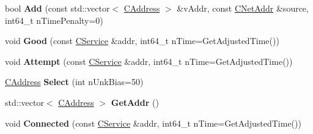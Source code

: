 \begin{DoxyCompactItemize}
\item 
\mbox{\label{class_c_addr_man_aa2ae2abdf710b2d81fa37f072bab028e}} 
bool {\bfseries Add} (const std\+::vector$<$ \mbox{\hyperlink{class_c_address}{C\+Address}} $>$ \&v\+Addr, const \mbox{\hyperlink{class_c_net_addr}{C\+Net\+Addr}} \&source, int64\+\_\+t n\+Time\+Penalty=0)
\item 
\mbox{\label{class_c_addr_man_a993e80e74701d7bc6bb49880c387b847}} 
void {\bfseries Good} (const \mbox{\hyperlink{class_c_service}{C\+Service}} \&addr, int64\+\_\+t n\+Time=Get\+Adjusted\+Time())
\item 
\mbox{\label{class_c_addr_man_afcddc2573121065177dc981cea710789}} 
void {\bfseries Attempt} (const \mbox{\hyperlink{class_c_service}{C\+Service}} \&addr, int64\+\_\+t n\+Time=Get\+Adjusted\+Time())
\item 
\mbox{\label{class_c_addr_man_a6aa6708d0ee55dba9ec6cefc9811c8e3}} 
\mbox{\hyperlink{class_c_address}{C\+Address}} {\bfseries Select} (int n\+Unk\+Bias=50)
\item 
\mbox{\label{class_c_addr_man_a69cc6138e696cf88de60925d26023bf2}} 
std\+::vector$<$ \mbox{\hyperlink{class_c_address}{C\+Address}} $>$ {\bfseries Get\+Addr} ()
\item 
\mbox{\label{class_c_addr_man_a7aba66d9e9527522fed974567d34c322}} 
void {\bfseries Connected} (const \mbox{\hyperlink{class_c_service}{C\+Service}} \&addr, int64\+\_\+t n\+Time=Get\+Adjusted\+Time())
\end{DoxyCompactItemize}
